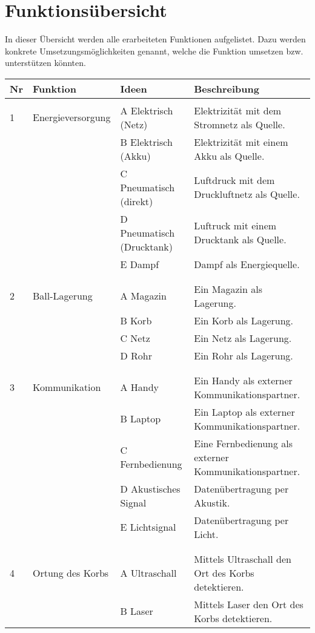 \section{Funktionsübersicht}
In dieser Übersicht werden alle erarbeiteten Funktionen aufgelistet. Dazu werden konkrete Umsetzungsmöglichkeiten genannt, welche die Funktion umsetzen bzw. unterstützen könnten.\\

\begin{longtable}{l p{4cm} p{4.5cm} p{7cm}}
	\textbf{Nr} & \textbf{Funktion} & \textbf{Ideen} & \textbf{Beschreibung} \\ \hline \\ \endhead 
	1  & Energieversorgung & A Elektrisch (Netz) & Elektrizität mit dem Stromnetz als Quelle. \\
	 &  & B Elektrisch (Akku) & Elektrizität mit einem Akku als Quelle. \\
	 &  & C Pneumatisch (direkt) &  Luftdruck mit dem Druckluftnetz als Quelle. \\
	 &  & D Pneumatisch (Drucktank) & Luftruck mit einem Drucktank als Quelle. \\
	 &  & E Dampf & Dampf als Energiequelle. \\ \\
	\hline \\
	2 & Ball-Lagerung & A Magazin & Ein Magazin als Lagerung. \\
	 &  & B Korb & Ein Korb als Lagerung. \\
	 &  & C Netz & Ein Netz als Lagerung. \\
	 &  & D Rohr & Ein Rohr als Lagerung. \\ \\
	\hline \\
	3 & Kommunikation & A Handy & Ein Handy als externer Kommunikationspartner. \\
	 &  & B Laptop & Ein Laptop als externer Kommunikationspartner. \\
	 &  & C Fernbedienung & Eine Fernbedienung als externer Kommunikationspartner. \\
	 &  & D Akustisches Signal & Datenübertragung per Akustik. \\
	 &  & E Lichtsignal & Datenübertragung per Licht. \\ \\
	\hline \\
	4 & Ortung des Korbs & A Ultraschall & Mittels Ultraschall den Ort des Korbs detektieren. \\
	 &  & B Laser & Mittels Laser den Ort des Korbs detektieren. \\

\end{longtable}
